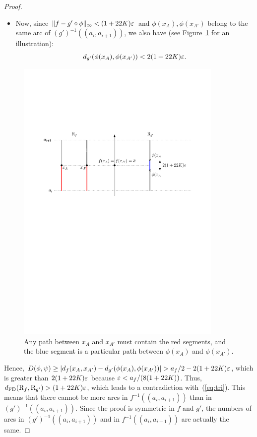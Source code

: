 \begin{proof}
\begin{itemize}
\item Now, since $\|f-g'\circ\phi\|_\infty<(1+22K)\varepsilon$ and $\phi(x_{A}),\phi(x_{A'})$ belong to the same arc of $(g')^{-1}((a_i,a_{i+1}))$,
we also have (see Figure~\ref{fig:smallBranches} for an illustration):
$$d_{g'}(\phi(x_{A}),\phi(x_{A'})) < 2(1+22K)\varepsilon.$$
\end{itemize}
%
\begin{figure}[h]\centering
\includegraphics[width=10cm]{figures/Arcs}
\caption[Arc number argument]{\label{fig:smallBranches} Any path between $x_A$ and $x_{A'}$ must contain the red segments, and the blue segment is a
particular path between $\phi(x_A)$ and $\phi(x_{A'})$.}
\end{figure}



Hence, $D(\phi, \psi) \geq
|d_f(x_A,x_{A'})-d_{g'}(\phi(x_{A}),\phi(x_{A'}))|> a_f/2-2(1+22K)\e$,
which is greater than $2(1+22K)\varepsilon$ because $\varepsilon<a_f/(8(1+22K))$. Thus,
$d_{\rm FD}(\mathrm{R}_f,\mathrm{R}_{g'})>(1+22K)\varepsilon$, which leads to a
contradiction with~(\ref{eq:tri}).  This means that there cannot be
more arcs in $f^{-1}((a_i,a_{i+1}))$ than in $(g')^{-1}((a_i,a_{i+1}))$.
Since the proof is symmetric in $f$ and $g'$, the numbers of arcs in
$(g')^{-1}((a_i,a_{i+1}))$ and in $f^{-1}((a_i,a_{i+1}))$ are actually the
same.


\end{proof}
